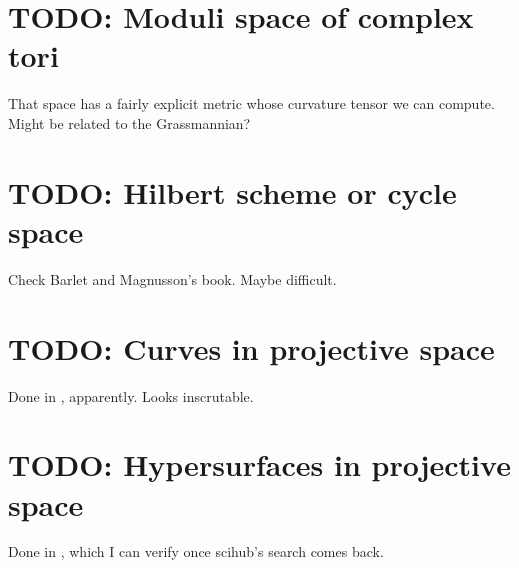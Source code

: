 \documentclass[11pt]{article}
\begin{document}
\section{TODO: Moduli space of complex tori}

That space has a fairly explicit metric whose curvature tensor we can compute. Might be related to the Grassmannian?


\section{TODO: Hilbert scheme or cycle space}

Check Barlet and Magnusson's book. Maybe difficult.

\section{TODO: Curves in projective space}

Done in \cite{fischer1983differential}, apparently. Looks inscrutable.

\section{TODO: Hypersurfaces in projective space}

Done in \cite{vitter1974curvature}, which I can verify once scihub's search comes back.





\end{document}

